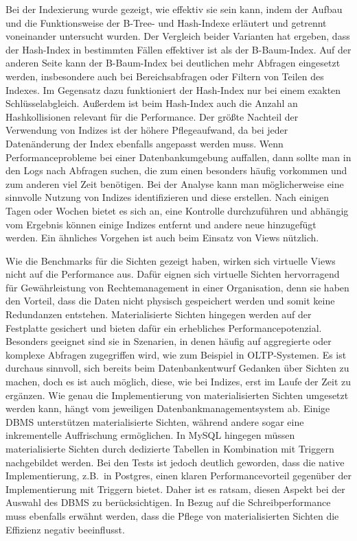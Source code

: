 Bei der Indexierung wurde gezeigt, wie effektiv sie sein kann, indem der Aufbau und die Funktionsweise der B-Tree- und Hash-Indexe erläutert und getrennt voneinander untersucht wurden.
Der Vergleich beider Varianten hat ergeben, dass der Hash-Index in bestimmten Fällen effektiver ist als der B-Baum-Index.
Auf der anderen Seite kann der B-Baum-Index bei deutlichen mehr Abfragen eingesetzt werden, insbesondere auch bei Bereichsabfragen oder Filtern von Teilen des Indexes.
Im Gegensatz dazu funktioniert der Hash-Index nur bei einem exakten Schlüsselabgleich.
Außerdem ist beim Hash-Index auch die Anzahl an Hashkollisionen relevant für die Performance.
Der größte Nachteil der Verwendung von Indizes ist der höhere Pflegeaufwand, da bei jeder Datenänderung der Index ebenfalls angepasst werden muss.
Wenn Performanceprobleme bei einer Datenbankumgebung auffallen, dann sollte man in den Logs nach Abfragen suchen, die zum einen besonders häufig vorkommen und zum anderen viel Zeit benötigen.
Bei der Analyse kann man möglicherweise eine sinnvolle Nutzung von Indizes identifizieren und diese erstellen.
Nach einigen Tagen oder Wochen bietet es sich an, eine Kontrolle durchzuführen und abhängig vom Ergebnis können einige Indizes entfernt und andere neue hinzugefügt werden.
Ein ähnliches Vorgehen ist auch beim Einsatz von Views nützlich.

Wie die Benchmarks für die Sichten gezeigt haben, wirken sich virtuelle Views nicht auf die Performance aus.
Dafür eignen sich virtuelle Sichten hervorragend für Gewährleistung von Rechtemanagement in einer Organisation, denn sie haben den Vorteil, dass die Daten nicht physisch gespeichert werden und somit keine Redundanzen entstehen.
Materialisierte Sichten hingegen werden auf der Festplatte gesichert und bieten dafür ein erhebliches Performancepotenzial.
Besonders geeignet sind sie in Szenarien, in denen häufig auf aggregierte oder komplexe Abfragen zugegriffen wird, wie zum Beispiel in OLTP-Systemen.
Es ist durchaus sinnvoll, sich bereits beim Datenbankentwurf Gedanken über Sichten zu machen, doch es ist auch möglich, diese, wie bei Indizes, erst im Laufe der Zeit zu ergänzen.
Wie genau die Implementierung von materialisierten Sichten umgesetzt werden kann, hängt vom jeweiligen Datenbankmanagementsystem ab.
Einige DBMS unterstützen materialisierte Sichten, während andere sogar eine inkrementelle Auffrischung ermöglichen.
In MySQL hingegen müssen materialisierte Sichten durch dedizierte Tabellen in Kombination mit Triggern nachgebildet werden.
Bei den Tests ist jedoch deutlich geworden, dass die native Implementierung, z.B.\ in Postgres, einen klaren Performancevorteil gegenüber der Implementierung mit Triggern bietet.
Daher ist es ratsam, diesen Aspekt bei der Auswahl des DBMS zu berücksichtigen.
In Bezug auf die Schreibperformance muss ebenfalls erwähnt werden, dass die Pflege von materialisierten Sichten die Effizienz negativ beeinflusst.

